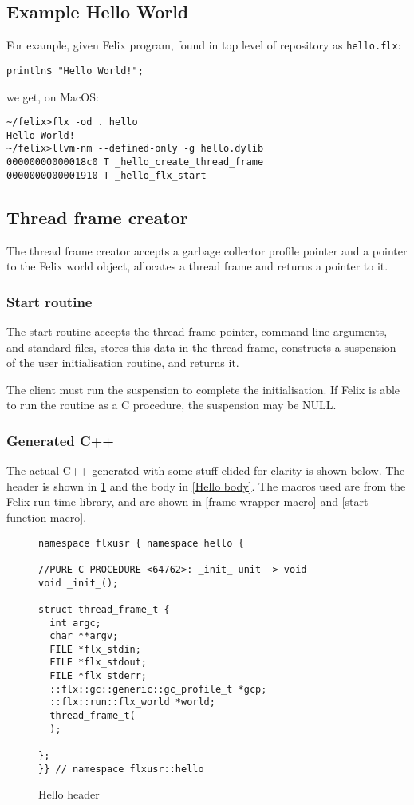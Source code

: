 \documentclass[oneside]{book}
\begin{document}
\subsection{Example Hello World}
For example, given Felix program, found in top level of repository as \verb$hello.flx$:
\begin{verbatim}
println$ "Hello World!";
\end{verbatim}

we get, on MacOS:

\begin{verbatim}
~/felix>flx -od . hello
Hello World!
~/felix>llvm-nm --defined-only -g hello.dylib
00000000000018c0 T _hello_create_thread_frame
0000000000001910 T _hello_flx_start
\end{verbatim}

\subsection{Thread frame creator}
The thread frame creator accepts a garbage collector profile
pointer and a pointer to the Felix world object, allocates
a thread frame and returns a pointer to it.

\subsubsection{Start routine}
The start routine accepts the thread frame pointer,
command line arguments, and standard files, stores
this data in the thread frame, constructs a suspension
of the user initialisation routine, and returns it.

The client must run the suspension to complete the initialisation.
If Felix is able to run the routine as a C procedure, the suspension
may be NULL.

\subsubsection{Generated C++}
The actual C++ generated with some stuff elided for clarity is shown below.
The header is shown in \ref{Hello header} and the body in \ref{Hello body}.
The macros used are from the Felix run time library, and are
shown in \ref{frame wrapper macro}
and \ref{start function macro}.


\begin{figure}[p]
\caption{Hello header\label{Hello header}}
\begin{verbatim}
namespace flxusr { namespace hello {

//PURE C PROCEDURE <64762>: _init_ unit -> void
void _init_();

struct thread_frame_t {
  int argc;
  char **argv;
  FILE *flx_stdin;
  FILE *flx_stdout;
  FILE *flx_stderr;
  ::flx::gc::generic::gc_profile_t *gcp;
  ::flx::run::flx_world *world;
  thread_frame_t(
  );

};
}} // namespace flxusr::hello
\end{verbatim}
\end{figure}
\end{document}
